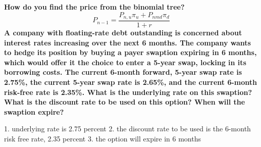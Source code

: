 \documentclass[12pt]{article}
\begin{document}
\begin{framed}
	
	\textbf{How do you find the price from the binomial tree?}
	$$
	P_{n-1} = \dfrac{P_{n,u} \pi_u + P_{nmd} \pi_d}{1 + r}
	$$
	\textbf{A company with floating-rate debt outstanding is concerned about interest rates increasing over the next 6 months. The company wants to hedge its position by buying a payer swaption expiring in 6 months, which would offer it the choice to enter a 5-year swap, locking in its borrowing costs. The current 6-month forward, 5-year swap rate is 2.75\%, the current 5-year swap rate is 2.65\%, and the current 6-month risk-free rate is 2.35\%. What is the underlying rate on this swaption? What is the discount rate to be used on this option? When will the swaption expire?}
	
	1. underlying rate is 2.75 percent
	2. the discount rate to be used is the 6-month risk free rate, 2.35 percent
	3. the option will expire in 6 months
	
\end{framed}
\end{document}

